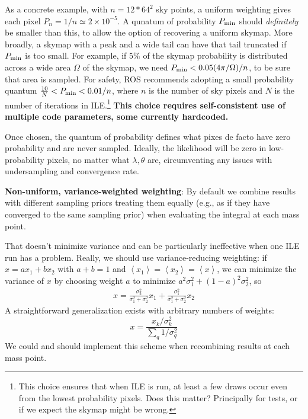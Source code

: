 As a concrete example, with $n=12*64^2$ sky points, a uniform weighting gives each pixel $P_{n}
=1/n \simeq 2\times 10^{-5}$.  A qunatum of probability $P_{\rm min} $ should \emph{definitely} be smaller than this, to
allow the option of recovering a uniform skymap.
%
More broadly, a skymap with a peak and a wide tail can have that tail truncated if $P_{\rm min}$ is too small.  For
example, if $5\%$ of the skymap probability is distributed across a wide area $\Omega$ of the skymap, we need $P_{\rm
  min} < 0.05 (4\pi/\Omega)/n$, to be sure that area is sampled.  
%
For safety, ROS recommends adopting a small probability quantum $\frac{10}{N}<P_{\rm min} < 0.01/n$, where $n$ is the
number of sky pixels and $N$ is the number of iterations in ILE.\footnote{This choice ensures that when ILE is run, at
  least a few draws occur even from the lowest probability pixels.  Does this matter?  Principally for tests, or if
we expect the \BS{} skymap might be wrong.}  \textbf{This choice requires self-consistent use of
  multiple code parameters, some currently hardcoded. }

Once chosen, the quantum of probability defines what pixes de facto have zero probability and are never sampled. 
Ideally, the likelihood will be zero in  low-probability pixels, no matter what $\lambda,\theta$ are, circumventing
any issues with undersampling and convergence rate.


\textbf{Non-uniform, variance-weighted weighting}: By default we combine results with different sampling priors treating
them equally (e.g., as if they have converged to the same sampling prior) when evaluating the integral at each mass
point.  

That doesn't minimize variance and can be particularly
ineffective when one ILE run has a problem.  Really, we should use variance-reducing weighting: if $x=ax_1 +b x_2$ with $a+b=1$ and
$\left<x_1\right> =\left<x_2\right> =\left<x\right>$, we can minimize the variance of $x$ by choosing weight $a$ to
minimize $a^2 \sigma_1^2 + (1-a)^2 \sigma_2^2$, so 
\begin{eqnarray}
x = \frac{\sigma_2^2}{\sigma_1^2+\sigma_2^2} x_1 +  \frac{\sigma_1^2}{\sigma_1^2+\sigma_2^2} x_2
\end{eqnarray}
A straightforward generalization exists with arbitrary numbers of weights:
\[
x = \frac{x_k/\sigma_k^2}{\sum_q 1/\sigma_q^2}
\]
We could and should implement this scheme when recombining results at each mass point. 

